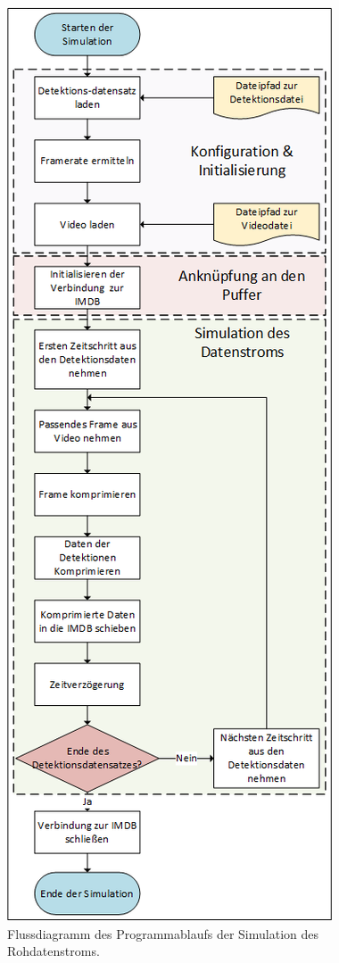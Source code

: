 \begin{figure}[p]
    \centering
    \includegraphics[height=0.9\textheight]{img/Grafiken/Flussdiagramm Simulation Rohdatenstrom.png}
    \caption{Flussdiagramm des Programmablaufs der Simulation des Rohdatenstroms.}
    \label{fig:FlussDia SimStream}
\end{figure}

